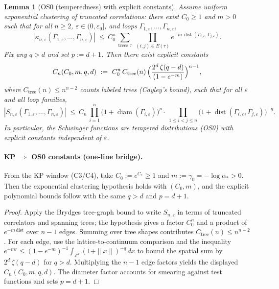\documentclass[11pt]{amsart}
\theoremstyle{plain}
\newtheorem{lemma}[theorem]{Lemma}
\theoremstyle{definition}
\theoremstyle{remark}
\begin{document}
\begin{lemma}[OS0 (temperedness) with explicit constants]
Assume uniform exponential clustering of truncated correlations: there exist $C_0\ge 1$ and $m>0$ such that for all $n\ge 2$, $\varepsilon\in(0,\varepsilon_0]$, and loops $\Gamma_{1,\varepsilon},\dots,\Gamma_{n,\varepsilon}$,
\[
  |\kappa_{n,\varepsilon}(\Gamma_{1,\varepsilon},\dots,\Gamma_{n,\varepsilon})|
   \ \le\ C_0^n\,\sum_{\text{trees }\tau}\ \prod_{(i,j)\in E(\tau)} e^{-m\,\operatorname{dist}(\Gamma_{i,\varepsilon},\Gamma_{j,\varepsilon})}.
\]
Fix any $q>d$ and set $p:=d+1$. Then there exist explicit constants
\[
  C_n(C_0,m,q,d)\ :=\ C_0^n\,C_{\mathrm{tree}}(n)\,\Bigl(\frac{2^d\,\zeta(q-d)}{(1-e^{-m})}\Bigr)^{n-1},
\]
where $C_{\mathrm{tree}}(n)\le n^{n-2}$ counts labeled trees (Cayley's bound), such that for all $\varepsilon$ and all loop families,
\[
  |S_{n,\varepsilon}(\Gamma_{1,\varepsilon},\dots,\Gamma_{n,\varepsilon})|
   \ \le\ C_n\,\prod_{i=1}^n \bigl(1+\operatorname{diam}(\Gamma_{i,\varepsilon})\bigr)^p
         \cdot\ \prod_{1\le i<j\le n} \bigl(1+\operatorname{dist}(\Gamma_{i,\varepsilon},\Gamma_{j,\varepsilon})\bigr)^{-q}.
\]
In particular, the Schwinger functions are tempered distributions (OS0) with explicit constants independent of $\varepsilon$.
\end{lemma}

\paragraph{KP $\Rightarrow$ OS0 constants (one-line bridge).}
From the KP window (C3/C4), take $C_0:=e^{C_*}\ge 1$ and $m:=\gamma_0=-\log\alpha_*>0$. Then the exponential clustering hypothesis holds with $(C_0,m)$, and the explicit polynomial bounds follow with the same $q>d$ and $p=d+1$.

\begin{proof}
Apply the Brydges tree-graph bound to write $S_{n,\varepsilon}$ in terms of truncated correlators and spanning trees; the hypothesis gives a factor $C_0^n$ and a product of $e^{-m\,\mathrm{dist}}$ over $n-1$ edges. Summing over tree shapes contributes $C_{\mathrm{tree}}(n)\le n^{n-2}$. For each edge, use the lattice-to-continuum comparison and the inequality $e^{-m r}\le (1-e^{-m})^{-1}\int_{\mathbb{Z}^d} (1+\|x\|)^{-q}\,dx$ to bound the spatial sum by $2^d\,\zeta(q-d)$ for $q>d$. Multiplying the $n-1$ edge factors yields the displayed $C_n(C_0,m,q,d)$. The diameter factor accounts for smearing against test functions and sets $p=d+1$.
\end{proof}
\end{document}
